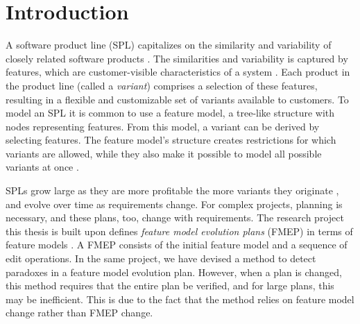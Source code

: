 \chapter{Introduction}

A software product line (SPL) capitalizes on the similarity and variability of closely related software products \cite{book:introduction-to-spl}. The similarities and variability is captured by features, which are customer-visible characteristics of a system \cite{book:introduction-to-spl}. Each product in the product line (called a \textit{variant}) comprises a selection of these features, resulting in a flexible and customizable set of variants available to customers. To model an SPL it is common to use a feature model, a tree-like structure with nodes representing features. From this model, a variant can be derived by selecting features. The feature model's structure creates restrictions for which variants are allowed, while they also make it possible to model all possible variants at once \cite{art:feature-models-grammars-and-propositional-formulas}.

SPLs grow large as they are more profitable the more variants they originate \cite{book:introduction-to-spl}, %
and evolve over time as requirements change. For complex projects, planning is necessary, and these plans, too, change with requirements.  The research project this thesis is built upon defines \emph{feature model evolution plans} (FMEP) in terms of feature models \cite{art:consistency-preserving-evolution-planning}.  A FMEP consists of the initial feature model and a sequence of edit operations. In the same project, we have devised a method to detect paradoxes in a feature model evolution plan.  However, when a plan is changed, this method requires that the entire plan be verified, and for large plans, this may be inefficient. This is due to the fact that the method relies on feature model change rather than FMEP change. 



